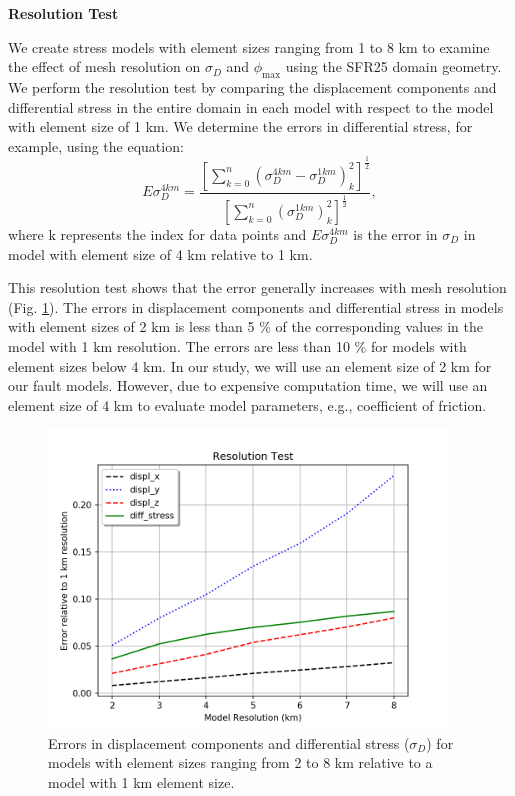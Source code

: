 \documentclass[draft,jgrga]{agutexSI2019}
\begin{document}
\begin{article}
\noindent\textbf{Resolution Test}
\vspace{10mm}

We create stress models with element sizes ranging from 1 to 8 km to examine the effect of mesh resolution on $\sigma_{D}$ and $\phi_{\max}$ using the SFR25 domain geometry. We perform the resolution test by comparing the displacement components and differential stress in the entire domain in each model with respect to the model with element size of 1 km. We determine the errors in differential stress, for example, using the equation:
%
\[
 E\sigma_{D}^{4km} = \frac{[\sum_{k=0}^n (\sigma_{D}^{4km} - \sigma_{D}^{1km})_{k}^2]^\frac{1}{2}}
{[\sum_{k=0}^n (\sigma_{D}^{1km})_{k}^2]^\frac{1}{2}},
\]
%
where k represents the index for data points and $ E\sigma_{D}^{4km} $ is the error in $\sigma_{D}$ in model with element size of 4 km relative to 1 km.

This resolution test shows that the error generally increases with mesh resolution (Fig. \ref{S1}). The errors in displacement components and differential stress in models with element sizes of 2 km is less than 5 \% of the corresponding values in the model with 1 km resolution. The errors are less than 10 \% for models with element sizes below 4 km. In our study, we will use an element size of 2 km for our fault models. However, due to expensive computation time, we will use an element size of 4 km to evaluate model parameters, e.g., coefficient of friction.
%
\begin{figure}[h!]
\includegraphics[width=25pc]{Figures/res_test_CSZ.png}
\caption{Errors in displacement components and differential stress ($\sigma_{D}$) for models with element sizes ranging from 2 to 8 km relative to a model with 1 km element size.}
\label{S1}
\end{figure}


\end{article}
\end{document}
